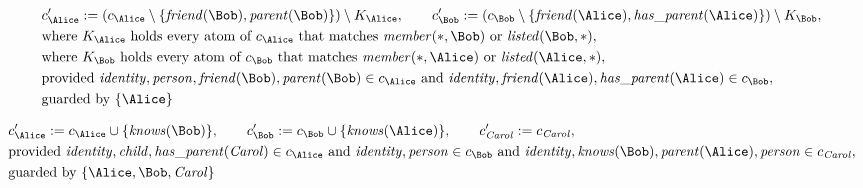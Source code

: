 \begin{align*}
&
c'_
{
\Alice
}
 := 
(c_
{
\Alice
}
 \setminus 
\{
\mathit{\detokenize{
friend
}}
(
\Bob
)
,
\mathit{\detokenize{
parent
}}
(
\Bob
)
\}
) \setminus K_
{
\Alice
}
, \qquad 
c'_
{
\Bob
}
 := 
(c_
{
\Bob
}
 \setminus 
\{
\mathit{\detokenize{
friend
}}
(
\Alice
)
,
\mathit{\detokenize{
has_parent
}}
(
\Alice
)
\}
) \setminus K_
{
\Bob
}
,\\
&
\text{where } K_
{
\Alice
}
 \text{ holds every atom of } c_
{
\Alice
}
 \text{ that matches } 
\mathit{\detokenize{
member
}}
(
\ast
,
\Bob
)
 \text{ or } 
\mathit{\detokenize{
listed
}}
(
\Bob
,
\ast
)
,\\
&
\text{where } K_
{
\Bob
}
 \text{ holds every atom of } c_
{
\Bob
}
 \text{ that matches } 
\mathit{\detokenize{
member
}}
(
\ast
,
\Alice
)
 \text{ or } 
\mathit{\detokenize{
listed
}}
(
\Alice
,
\ast
)
,\\
&
\text{provided } 
\mathit{\detokenize{
identity
}}
,
\mathit{\detokenize{
person
}}
,
\mathit{\detokenize{
friend
}}
(
\Bob
)
,
\mathit{\detokenize{
parent
}}
(
\Bob
)
 \in c_
{
\Alice
}
 \text{ and } 
\mathit{\detokenize{
identity
}}
,
\mathit{\detokenize{
friend
}}
(
\Alice
)
,
\mathit{\detokenize{
has_parent
}}
(
\Alice
)
 \in c_
{
\Bob
}
,\\
&
\text{guarded by } \{
\Alice
\}
\end{align*}

\begin{align*}
&
c'_
{
\Alice
}
 := 
c_
{
\Alice
}
 \cup 
\{
\mathit{\detokenize{
knows
}}
(
\Bob
)
\}
, \qquad 
c'_
{
\Bob
}
 := 
c_
{
\Bob
}
 \cup 
\{
\mathit{\detokenize{
knows
}}
(
\Alice
)
\}
, \qquad 
c'_
{
\mathit{Carol}
}
 := 
c_
{
\mathit{Carol}
}
,\\
&
\text{provided } 
\mathit{\detokenize{
identity
}}
,
\mathit{\detokenize{
child
}}
,
\mathit{\detokenize{
has_parent
}}
(
\mathit{Carol}
)
 \in c_
{
\Alice
}
 \text{ and } 
\mathit{\detokenize{
identity
}}
,
\mathit{\detokenize{
person
}}
 \in c_
{
\Bob
}
 \text{ and } 
\mathit{\detokenize{
identity
}}
,
\mathit{\detokenize{
knows
}}
(
\Bob
)
,
\mathit{\detokenize{
parent
}}
(
\Alice
)
,
\mathit{\detokenize{
person
}}
 \in c_
{
\mathit{Carol}
}
,\\
&
\text{guarded by } \{
\Alice
,
\Bob
,
\mathit{Carol}
\}
\end{align*}


